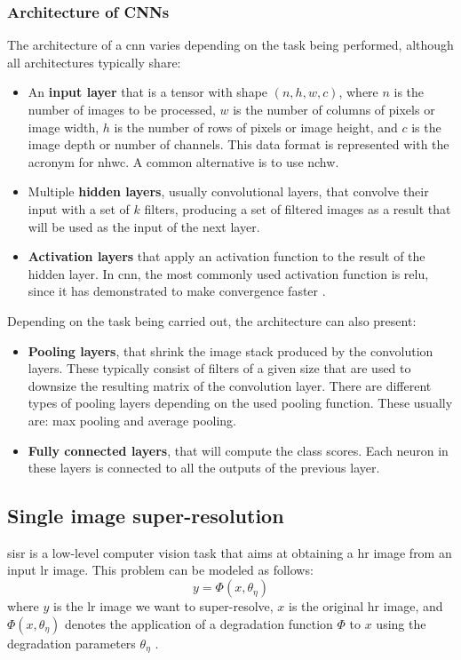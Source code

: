 \subsubsection*{Architecture of CNNs}
The architecture of a \gls{cnn} varies depending on the task being performed, although all architectures typically share:
\begin{itemize}
	\item An \textbf{input layer} that is a tensor with shape 
	$(n, h, w, c)$, where $n$ is the number of images to be processed, $w$ is the number of columns of pixels or image width, $h$ is the number of rows of pixels or image height, and $c$ is the image depth or number of channels. This data format is represented with the acronym for \gls{nhwc}. A common alternative is to use \gls{nchw}.
	\item Multiple \textbf{hidden layers}, usually convolutional layers, that convolve their input with a set of $k$ filters, producing a set of filtered images as a result that will be used as the input of the next layer.
	\item \textbf{Activation layers} that apply an activation function to the result of the hidden layer. In \gls{cnn}, the most commonly used activation function is \gls{relu}, since it has demonstrated to make convergence faster \cite{RELU}.
\end{itemize}

Depending on the task being carried out, the architecture can also present:
\begin{itemize}
	\item \textbf{Pooling layers}, that shrink the image stack produced by the convolution layers. These typically consist of filters of a given size that are used to downsize the resulting matrix of the convolution layer. There are different types of pooling layers depending on the used pooling function. These usually are: max pooling and average pooling.
	\item \textbf{Fully connected layers}, that will compute the class scores. Each neuron in these layers is connected to all the outputs of the previous layer.
\end{itemize}

\subsection{Single image super-resolution}

\gls{sisr} is a low-level computer vision task that aims at obtaining a \gls{hr} image from an input \gls{lr} image. This problem can be modeled as follows:
$$y = \Phi(x, \theta_\eta)$$
where $y$ is the \gls{lr} image we want to super-resolve, $x$ is the original \gls{hr} image, and $\Phi(x, \theta_\eta)$ denotes the application of a degradation function $\Phi$ to $x$ using the degradation parameters $\theta_\eta$ \cite{DBLP:SISR}. 

